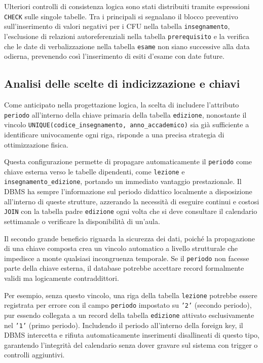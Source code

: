 Ulteriori controlli di consistenza logica sono stati distribuiti tramite espressioni \texttt{CHECK} sulle singole tabelle. Tra i principali si segnalano il blocco preventivo sull'inserimento di valori negativi per i CFU nella tabella \texttt{insegnamento}, l'esclusione di relazioni autoreferenziali nella tabella \texttt{prerequisito} e la verifica che le date di verbalizzazione nella tabella \texttt{esame} non siano successive alla data odierna, prevenendo così l'inserimento di esiti d'esame con date future.

\subsection{Analisi delle scelte di indicizzazione e chiavi}
\label{ssec:analisi-delle-scelte-di-indicizzazione-e-chiavi}

Come anticipato nella progettazione logica, la scelta di includere l'attributo \texttt{periodo} all'interno della chiave primaria della tabella \texttt{edizione}, nonostante il vincolo \texttt{UNIQUE(codice\_insegnamento, anno\_accademico)} sia già sufficiente a identificare univocamente ogni riga, risponde a una precisa strategia di ottimizzazione fisica.

Questa configurazione permette di propagare automaticamente il \texttt{periodo} come chiave esterna verso le tabelle dipendenti, come \texttt{lezione} e \texttt{insegnamento\_edizione}, portando un immediato vantaggio prestazionale.
Il DBMS ha sempre l'informazione sul periodo didattico localmente a disposizione all'interno di queste strutture, azzerando la necessità di eseguire continui e costosi \texttt{JOIN} con la tabella padre \texttt{edizione} ogni volta che si deve consultare il calendario settimanale o verificare la disponibilità di un'aula.

Il secondo grande beneficio riguarda la sicurezza dei dati, poiché la propagazione di una chiave composta crea un vincolo automatico a livello strutturale che impedisce a monte qualsiasi incongruenza temporale.
Se il \texttt{periodo} non facesse parte della chiave esterna, il database potrebbe accettare record formalmente validi ma logicamente contraddittori.

Per esempio, senza questo vincolo, una riga della tabella \texttt{lezione} potrebbe essere registrata per errore con il campo \texttt{periodo} impostato su \texttt{'2'} (secondo periodo), pur essendo collegata a un record della tabella \texttt{edizione} attivato esclusivamente nel \texttt{'1'} (primo periodo). Includendo il periodo all'interno della foreign key, il DBMS intercetta e rifiuta automaticamente inserimenti disallineati di questo tipo, garantendo l'integrità del calendario senza dover gravare sul sistema con trigger o controlli aggiuntivi.

